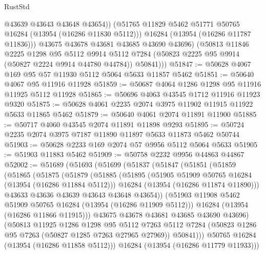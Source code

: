 \begin{lexlean}{RustStd}
\begin{coremodule}
                @43639
                @43643
                @43648
                @43654))
            (@51765 @11829 @5462 @51771 @50765 @16284 (@13954 (@16286 @11830 @5112)))
            @16284
            (@13954 (@16286 @11787 @11836)))
          @43675
          @43678
          @43681
          @43685
          @43690
          @43696)
        (@50813
          @11846
          @2225
          @1298
          @95
          @5112
          @9914
          @5112
          @7284
          (@50823 @2225 @95 @9914 (@50827 @2224 @9914 @44780 @44784))
          @50841)))
@51847 := @50628 @4067 @169 @95 @57 @11930 @5112 @5064 @5633 @11857 @5462
@51851 := @50640 @4067 @95 @11916 @11928
@51859 := @50687 @4064 @1286 @1298 @95 @11916 @11925 @5112 @11928
@51865 := @50696 @4063 @43545 @1712 @11916 @11923 @9320
@51875 := @50628 @4061 @2235 @2074 @3975 @11902 @11915 @11922 @5633 @11865 @5462
@51879 := @50640 @4061 @2074 @11891 @11900
@51885 := @50717 @4060 @43545 @2074 @11891 @11898 @9293
@51895 := @50724 @2235 @2074 @3975 @7187 @11890 @11897 @5633 @11873 @5462 @50744
@51903 := @50628 @2233 @169 @2074 @57 @9956 @5112 @5064 @5633
@51905 := @51903 @11883 @5462
@51909 := @50758 @2232 @9956 @44863 @44867
@52002 := @51689
    (@51693
      (@51699
        (@51837
          (@51847
            (@51851
              (@51859
                (@51865
                  (@51875
                    (@51879
                      (@51885
                        (@51895
                          (@51905 @51909 @50765 @16284 (@13954 (@16286 @11884 @5112)))
                          @16284
                          (@13954 (@16286 @11874 @11890)))
                        @43633
                        @43636
                        @43639
                        @43643
                        @43648
                        @43654))
                    (@51903 @11908 @5462 @51909 @50765 @16284 (@13954 (@16286 @11909 @5112)))
                    @16284
                    (@13954 (@16286 @11866 @11915)))
                  @43675
                  @43678
                  @43681
                  @43685
                  @43690
                  @43696)
                (@50813
                  @11925
                  @1286
                  @1298
                  @95
                  @5112
                  @7263
                  @5112
                  @7284
                  (@50823 @1286 @95 @7263 (@50827 @1285 @7263 @27965 @27969))
                  @50841)))
            @50765
            @16284
            (@13954 (@16286 @11858 @5112)))
          @16284
          (@13954 (@16286 @11779 @11933)))

\end{coremodule}
\end{lexlean}
